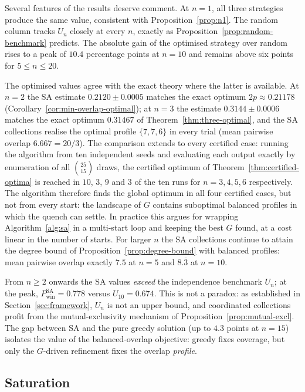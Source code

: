 Several features of the results deserve comment.  At $n=1$, all three
strategies produce the same value, consistent with
Proposition~\ref{prop:n1}.  The random column tracks $U_n$ closely at every
$n$, exactly as Proposition~\ref{prop:random-benchmark} predicts.  The
absolute gain of the optimised strategy over random rises to a peak of
$10.4$ percentage points at $n = 10$ and remains above six points for
$5 \le n \le 20$.

The optimised values agree with the exact theory where the latter is
available.  At $n = 2$ the SA estimate $0.2120 \pm 0.0005$ matches the
exact optimum $2p \approx 0.21178$ (Corollary~\ref{cor:min-overlap-optimal});
at $n = 3$ the estimate $0.3144 \pm 0.0006$ matches the exact optimum
$0.31467$ of Theorem~\ref{thm:three-optimal}, and the SA collections
realise the optimal profile $\{7,7,6\}$ in every trial (mean pairwise
overlap $6.667 = 20/3$).  The comparison extends to every certified case:
running the algorithm from ten independent seeds and evaluating each
output exactly by enumeration of all $\binom{25}{15}$ draws, the
certified optimum of Theorem~\ref{thm:certified-optima} is reached in
$10$, $3$, $9$ and $3$ of the ten runs for $n = 3,4,5,6$ respectively.
The algorithm therefore finds the global optimum in all four certified
cases, but not from every start: the landscape of $G$ contains suboptimal
balanced profiles in which the quench can settle.  In practice this
argues for wrapping Algorithm~\ref{alg:sa} in a multi-start loop and
keeping the best $G$ found, at a cost linear in the number of starts.
For larger $n$ the SA collections continue to attain
the degree bound of Proposition~\ref{prop:degree-bound} with balanced
profiles: mean pairwise overlap exactly $7.5$ at $n=5$ and
$8.\overline{3}$ at $n=10$.

From $n \ge 2$ onwards the SA values \emph{exceed} the independence
benchmark $U_n$; at the peak, $P_{\mathrm{win}}^{\mathrm{SA}} = 0.778$
versus $U_{10} = 0.674$.  This is not a paradox: as established in
Section~\ref{sec:framework}, $U_n$ is not an upper bound, and coordinated
collections profit from the mutual-exclusivity mechanism of
Proposition~\ref{prop:mutual-excl}.  The gap between SA and the pure
greedy solution (up to $4.3$ points at $n = 15$) isolates the value of the
balanced-overlap objective: greedy fixes coverage, but only the $G$-driven
refinement fixes the overlap \emph{profile}.

\subsection{Saturation}
\label{sec:saturation}

